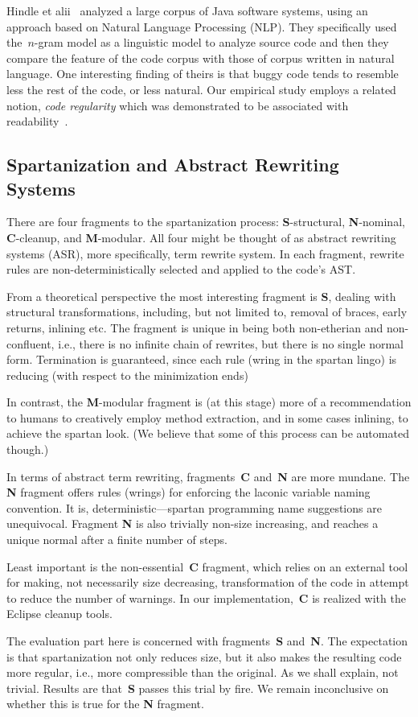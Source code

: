 Hindle et alii~\cite{Hindle:Bar:Su:Gabel:Devanbu:12} analyzed a large corpus of
Java software systems, using an approach based on Natural Language Processing
(NLP). They specifically used the~$n$-gram model as a linguistic model to
analyze source code and then they compare the feature of the code corpus with
those of corpus written in natural language. One interesting finding of theirs
is that buggy code tends to resemble less the rest of the code, or less
natural. Our empirical study employs a related notion, \emph{code regularity}
which was demonstrated to be associated with
readability~\cite{Jbara:Feitelson:14}.

\subsection{Spartanization and Abstract Rewriting Systems}

There are four fragments to the spartanization process: \textbf{S}-structural,
\textbf{N}-nominal, \textbf{C}-cleanup, and \textbf{M}-modular. All four might
be thought of as abstract rewriting systems (ASR), more specifically, term
rewrite system. In each fragment, rewrite rules are non-deterministically
selected and applied to the code's AST.

From a theoretical perspective the most interesting fragment is \textbf{S},
dealing with structural transformations, including, but not limited to, removal
of braces, early returns, inlining etc. The fragment is unique in being both
non-etherian and non-confluent, i.e., there is no infinite chain of rewrites,
but there is no single normal form. Termination is guaranteed, since each rule
(wring in the spartan lingo) is reducing (with respect to the minimization
ends)

In contrast, the \textbf{M}-modular fragment is (at this stage) more of a
recommendation to humans to creatively employ method extraction, and in some
cases inlining, to achieve the spartan look. (We believe that some of this
process can be automated though.)

In terms of abstract term rewriting, fragments~\textbf{C} and~\textbf{N} are
more mundane. The \textbf{N} fragment offers rules (wrings) for enforcing the
laconic variable naming convention. It is, deterministic---spartan programming
name suggestions are unequivocal. Fragment \textbf{N} is also trivially
non-size increasing, and reaches a unique normal after a finite number of
steps.

Least important is the non-essential~\textbf{C} fragment, which relies on an
external tool for making, not necessarily size decreasing, transformation of
the code in attempt to reduce the number of warnings. In our
implementation,~\textbf{C} is realized with the Eclipse cleanup tools.

The evaluation part here is concerned with fragments~\textbf{S}
and~\textbf{N}. The expectation is that spartanization not only reduces size,
but it also makes the resulting code more regular, i.e., more compressible than
the original. As we shall explain, not trivial. Results are that~\textbf{S}
passes this trial by fire.  We remain inconclusive on whether this is true for
the \textbf{N} fragment.
